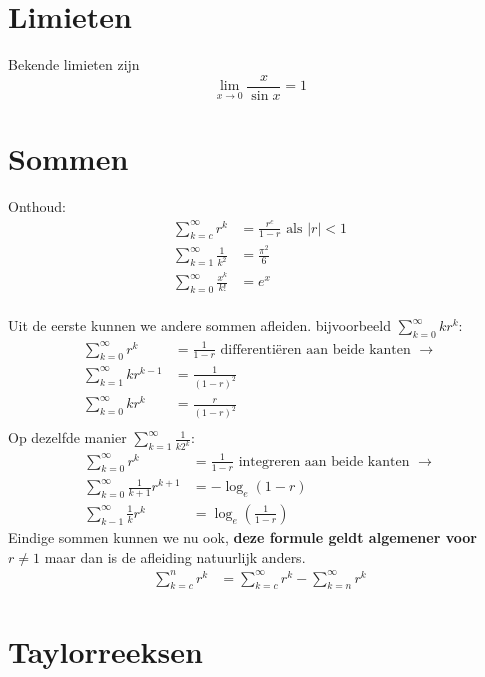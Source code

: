 \documentclass{article}
\begin{document}
	\tableofcontents
	\newpage

	\section{Limieten}\label{sec:limieten}
    Bekende limieten zijn
    \[
        \lim_{x\to 0} \frac{x}{\sin x} = 1
    \]
	\section{Sommen}\label{sec:sommen}
 		Onthoud:
 		\begin{align*}
 			\sum_{k=c}^{\infty} r^k &= \frac{r^c}{1-r} \text{ als $|r|<1$}\\
 			\sum_{k=1}^{\infty} \frac{1}{k^2} &= \frac{\pi^2}{6} \\
 			\sum_{k=0}^\infty \frac{x^k}{k!} &= e^x \\
 		\end{align*}
 		
 		Uit de eerste kunnen we andere sommen afleiden.
 		bijvoorbeeld
 		$\displaystyle \sum_{k=0}^{\infty} kr^k: $
 		\begin{align*}
 				\sum_{k=0}^{\infty} r^k &= \frac{1}{1-r} \text { differenti\"eren aan beide kanten } \to \\
 				\sum_{k=1}^{\infty} kr^{k-1} &= \frac{1}{(1-r)^2} \\
 				\sum_{k=0}^{\infty} kr^k &= \frac{r}{(1-r)^2} \\
 		\end{align*}
 		Op dezelfde manier $\displaystyle \sum_{k=1}^{\infty} \frac{1}{k2^k}$:
 		\begin{align*}
 				\sum_{k=0}^{\infty} r^k &= \frac{1}{1-r} \text { integreren aan beide kanten } \to \\
 				\sum_{k=0}^{\infty} \frac{1}{k+1} r^{k+1} &= -\log_e (1-r) \\
 				\sum_{k-1}^\infty \frac{1}{k} r^k &= \log_e (\frac{1}{1-r})
 		\end{align*}
 		Eindige sommen kunnen we nu ook, \textbf{deze formule geldt algemener voor $r\neq 1$} maar dan is de afleiding natuurlijk anders.
 		\begin{align*}
 			\sum_{k=c}^n r^k &= \sum_{k=c}^\infty r^k - \sum_{k=n}^\infty r^k
 		\end{align*}

	\section{Taylorreeksen}\label{sec:taylorreeksen}
	
\end{document}
